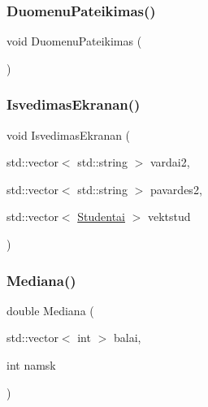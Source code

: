 \subsubsection{\texorpdfstring{DuomenuPateikimas()}{DuomenuPateikimas()}}
{\footnotesize\ttfamily void Duomenu\+Pateikimas (\begin{DoxyParamCaption}{ }\end{DoxyParamCaption})}

\mbox{\label{_komandos-_x_8cpp_ae8c00302f468b7b77bd196d1058b3d00}} 
\subsubsection{\texorpdfstring{IsvedimasEkranan()}{IsvedimasEkranan()}}
{\footnotesize\ttfamily void Isvedimas\+Ekranan (\begin{DoxyParamCaption}\item[{std\+::vector$<$ std\+::string $>$}]{vardai2,  }\item[{std\+::vector$<$ std\+::string $>$}]{pavardes2,  }\item[{std\+::vector$<$ \mbox{\hyperlink{class_studentai}{Studentai}} $>$}]{vektstud }\end{DoxyParamCaption})}

\mbox{\label{_komandos-_x_8cpp_a7d536233ded6efdd4a660ea68fd71368}} 
\subsubsection{\texorpdfstring{Mediana()}{Mediana()}}
{\footnotesize\ttfamily double Mediana (\begin{DoxyParamCaption}\item[{std\+::vector$<$ int $>$}]{balai,  }\item[{int}]{namsk }\end{DoxyParamCaption})}

\mbox{\label{_komandos-_x_8cpp_a32e6fe3b9a2349d258a6f67ce0331b0c}} 
